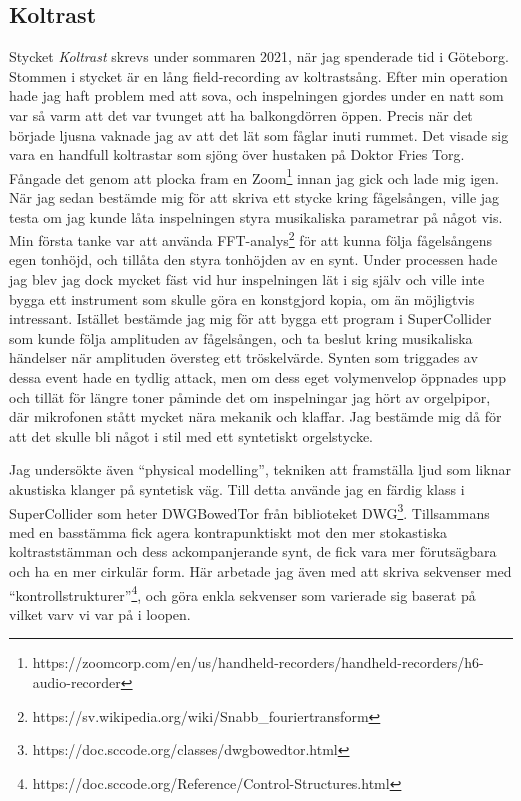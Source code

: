 \documentclass{article}
\begin{document}
\subsection{Koltrast}
Stycket \emph{Koltrast} skrevs under sommaren 2021, när jag spenderade tid i Göteborg. Stommen i stycket
är en lång field-recording av koltrastsång. Efter min operation hade jag haft problem med att sova, och
inspelningen gjordes under en natt som var så varm att det var tvunget att ha balkongdörren öppen. Precis
när det började ljusna vaknade jag av att det lät som fåglar inuti rummet. Det visade sig vara en handfull
koltrastar som sjöng över hustaken på Doktor Fries Torg. Fångade det genom att plocka fram en
Zoom\footnote{https://zoomcorp.com/en/us/handheld-recorders/handheld-recorders/h6-audio-recorder} innan
jag gick och lade mig igen. När jag sedan bestämde mig för att skriva ett stycke kring fågelsången, ville
jag testa om jag kunde låta inspelningen styra musikaliska parametrar på något vis. Min första tanke var
att använda FFT-analys\footnote{https://sv.wikipedia.org/wiki/Snabb\_fouriertransform} för att kunna följa
fågelsångens egen tonhöjd, och tillåta den styra
tonhöjden av en synt. Under processen hade jag blev jag dock mycket fäst vid hur inspelningen lät i sig
själv och ville inte bygga ett instrument som skulle göra en konstgjord kopia, om än möjligtvis
intressant. Istället bestämde jag mig för att bygga ett program i SuperCollider som kunde följa amplituden
av fågelsången, och ta beslut kring musikaliska händelser när amplituden översteg ett tröskelvärde. Synten
som triggades av dessa event hade en tydlig attack, men om dess eget volymenvelop öppnades upp och tillät
för längre toner påminde det om inspelningar jag hört av orgelpipor, där mikrofonen stått mycket nära
mekanik och klaffar. Jag bestämde mig då för att det skulle bli något i stil med ett syntetiskt
orgelstycke.


Jag undersökte även ``physical modelling'', tekniken att framställa ljud som liknar akustiska klanger på
syntetisk väg. Till detta använde jag en färdig klass i SuperCollider som heter DWGBowedTor från
biblioteket DWG\footnote{https://doc.sccode.org/classes/dwgbowedtor.html}. Tillsammans med en basstämma fick agera kontrapunktiskt mot den mer
stokastiska koltraststämman och dess ackompanjerande synt, de fick vara mer förutsägbara och ha en mer
cirkulär form. Här arbetade jag även med att skriva sekvenser med ``kontrollstrukturer''\footnote{https://doc.sccode.org/Reference/Control-Structures.html}, och göra enkla sekvenser som varierade sig baserat på vilket varv vi var på i
loopen. 
\pagebreak
\end{document}
